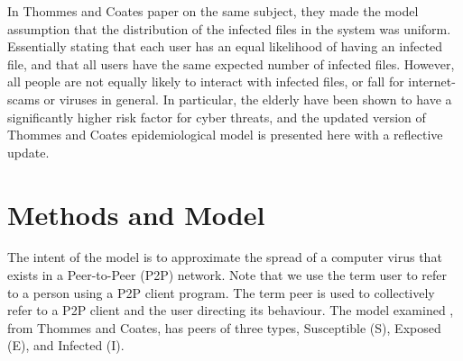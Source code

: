 \documentclass[12pt, oneside]{article}
\begin{document}
        In Thommes and Coates paper on the same subject, they made the model assumption that the distribution of the infected files in the system was uniform. Essentially
        stating that each user has an equal likelihood of having an infected file, and that all users have the same expected number of infected files. However, all people are not equally
        likely to interact with infected files, or fall for internet-scams or viruses in general. In particular, the elderly have been shown to have a significantly higher risk factor for cyber
        threats, and the updated version of Thommes and Coates epidemiological model is presented here with a reflective update.

    \section{Methods and Model}
    
        The intent of the model is to approximate the spread of a computer virus that exists in a Peer-to-Peer (P2P) network. Note that we use the term user
        to refer to a person using a P2P client program. The term peer is used to collectively refer to a P2P client and the user directing its behaviour.
        The model examined \cite{1689197}, from Thommes and Coates, has peers of three types, Susceptible (S), Exposed (E), and Infected (I). 
\end{document}
